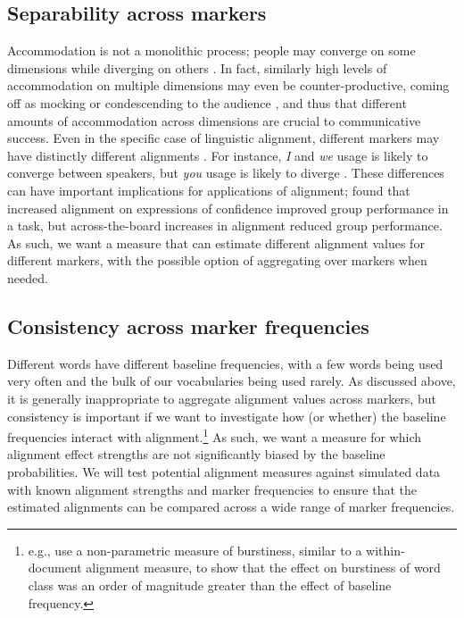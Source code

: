 \documentclass{acm_proc_article-sp}
\begin{document}
\subsection{Separability across markers}

 Accommodation is not a monolithic process; people may converge on some dimensions while diverging on others \cite{BilousKrauss1988,Ferrara1991}. In fact, similarly high levels of accommodation on multiple dimensions may even be counter-productive, coming off as mocking or condescending to the audience \cite{GilesSmith1979,GilesCouplandCoupland1991}, and thus that different amounts of accommodation across dimensions are crucial to communicative success. Even in the specific case of linguistic alignment, different markers may have distinctly different alignments \cite{DNMGamonDumais2011,IrelandEtAl2011}. For instance, \textit{I} and \textit{we} usage is likely to converge between speakers, but \textit{you} usage is likely to diverge \cite{NiederhofferPennebaker2002,GonzalesHancockPennebaker2010}. These differences can have important implications for applications of alignment; \cite{FusaroliEtAl2012} found that increased alignment on expressions of confidence improved group performance in a task, but across-the-board increases in alignment reduced group performance.  As such, we want a measure that can estimate different alignment values for different markers, with the possible option of aggregating over markers when needed.

\subsection{Consistency across marker frequencies} 

Different words have different baseline frequencies, with a few words being used very often and the bulk of our vocabularies being used rarely. As discussed above, it is generally inappropriate to aggregate alignment values across markers, but consistency is important if we want to investigate how (or whether) the baseline frequencies interact with alignment.\footnote{e.g., \cite{Church2000} use a non-parametric measure of burstiness, similar to a within-document alignment measure, to show that the effect on burstiness of word class was an order of magnitude greater than the effect of baseline frequency.}   As such, we want a measure for which alignment effect strengths are not significantly biased by the baseline probabilities.  We will test potential alignment measures against simulated data with known alignment strengths and marker frequencies to ensure that the estimated alignments can be compared across a wide range of marker frequencies.  %
\end{document}
